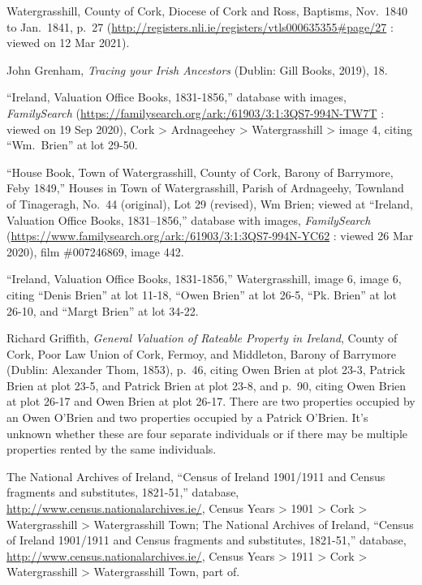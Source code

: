 \begin{thebibliography}{999}
Watergrasshill, County of Cork, Diocese of Cork and Ross, Baptisms, Nov.\ 1840 to Jan.\ 1841, p.\ 27 (\url{http://registers.nli.ie/registers/vtls000635355\#page/27} : viewed on 12 Mar 2021).

John Grenham, \textit{Tracing your Irish Ancestors} (Dublin: Gill Books, 2019), 18.

``Ireland, Valuation Office Books, 1831-1856,'' database with images, \textit{FamilySearch} (\url{https://familysearch.org/ark:/61903/3:1:3QS7-994N-TW7T} : viewed on 19 Sep 2020), Cork > Ardnageehey > Watergrasshill > image 4, citing ``Wm.\ Brien'' at lot 29-50.

``House Book, Town of Watergrasshill, County of Cork, Barony of Barrymore, Feby 1849,'' Houses in Town of Watergrasshill, Parish of Ardnageehy, Townland of Tinageragh, No.\ 44 (original), Lot 29 (revised), Wm Brien; viewed at ``Ireland, Valuation Office Books, 1831--1856,'' database with images, \textit{FamilySearch} (\url{https://www.familysearch.org/ark:/61903/3:1:3QS7-994N-YC62} : viewed 26 Mar 2020), film \#007246869, image 442.

``Ireland, Valuation Office Books, 1831-1856,'' Watergrasshill, image 6, image 6, citing ``Denis Brien'' at lot 11-18, ``Owen Brien'' at lot 26-5, ``Pk. Brien'' at lot 26-10, and ``Margt Brien'' at lot 34-22.

Richard Griffith, \textit{General Valuation of Rateable Property in Ireland}, County of Cork, Poor Law Union of Cork, Fermoy, and Middleton, Barony of Barrymore (Dublin: Alexander Thom, 1853), p.\ 46, citing Owen Brien at plot 23-3, Patrick Brien at plot 23-5, and Patrick Brien at plot 23-8, and p.\ 90, citing Owen Brien at plot 26-17 and Owen Brien at plot 26-17. There are two properties occupied by an Owen O'Brien and two properties occupied by a Patrick O'Brien. It's unknown whether these are four separate individuals or if there may be multiple properties rented by the same individuals.

The National Archives of Ireland, ``Census of Ireland 1901/1911 and Census fragments and substitutes, 1821-51,'' database, \url{http://www.census.nationalarchives.ie/}, Census Years > 1901 > Cork > Watergrasshill > Watergrasshill Town; The National Archives of Ireland, ``Census of Ireland 1901/1911 and Census fragments and substitutes, 1821-51,'' database, \url{http://www.census.nationalarchives.ie/}, Census Years > 1911 > Cork > Watergrasshill > Watergrasshill Town, part of.


\end{thebibliography}

